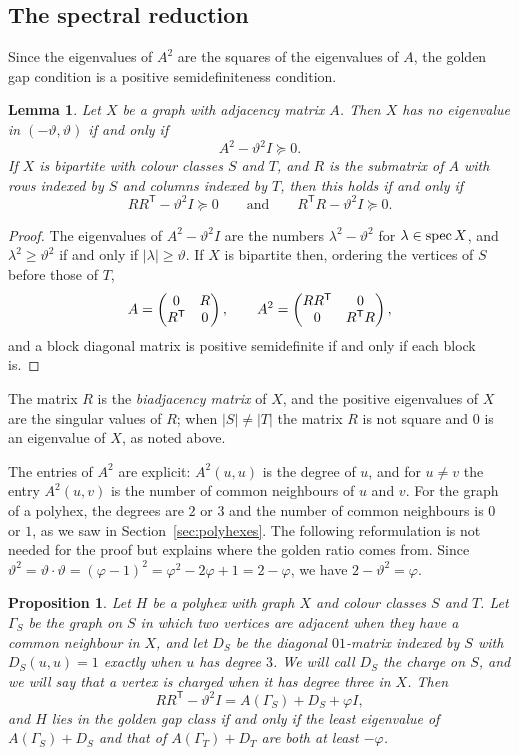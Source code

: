 \documentclass[11pt]{article}
\newcommand\vphi{\varphi}
\newcommand\thetaG{\vartheta}
\newcommand\spec{\opk{spec}}
\newcommand\tp{^{\mathsf T}}
\newcommand\abs[1]{\lvert #1\rvert}
\newtheorem{lemma}[theorem]{Lemma}
\newtheorem{proposition}[theorem]{Proposition}
\theoremstyle{definition}
\begin{document}
\subsection{The spectral reduction}

Since the eigenvalues of $A^2$ are the squares of the eigenvalues of $A$, the
golden gap condition is a positive semidefiniteness condition.

\begin{lemma}\label{lem:reduction}
Let $X$ be a graph with adjacency matrix $A$.  Then $X$ has no eigenvalue in
$(-\thetaG,\thetaG)$ if and only if
\[
 A^{2}-\thetaG^{2}I\succeq0 .
\]
If $X$ is bipartite with colour classes $S$ and $T$, and $R$ is the
submatrix of $A$ with rows indexed by $S$ and columns indexed by $T$, then
this holds if and only if
\[
 RR\tp-\thetaG^{2}I\succeq0
 \qquad\text{and}\qquad
 R\tp R-\thetaG^{2}I\succeq0 .
\]
\end{lemma}

\begin{proof}
The eigenvalues of $A^2-\thetaG^2I$ are the numbers $\lambda^2-\thetaG^2$
for $\lambda\in\spec X$, and $\lambda^2\ge\thetaG^2$ if and only if
$\abs\lambda\ge\thetaG$.  If $X$ is bipartite then, ordering the vertices of
$S$ before those of $T$,
\[
 A=\pmat{0 & R\\ R\tp & 0},\qquad
 A^{2}=\pmat{RR\tp & 0\\ 0 & R\tp R},
\]
and a block diagonal matrix is positive semidefinite if and only if each
block is.
\end{proof}

The matrix $R$ is the \textsl{biadjacency matrix} of $X$, and the positive
eigenvalues of $X$ are the singular values of $R$; when $\abs S\ne\abs T$
the matrix $R$ is not square and $0$ is an eigenvalue of $X$, as noted
above.

The entries of $A^2$ are explicit: $A^2(u,u)$ is the degree of $u$, and for
$u\ne v$ the entry $A^2(u,v)$ is the number of common neighbours of $u$ and
$v$.  For the graph of a polyhex, the degrees are $2$ or $3$ and the number
of common neighbours is $0$ or $1$, as we saw in
Section~\ref{sec:polyhexes}.  The following reformulation is not needed for
the proof but explains where the golden ratio comes from.  Since
$\thetaG^2=\thetaG\cdot\thetaG=(\vphi-1)^2=\vphi^2-2\vphi+1=2-\vphi$, we have
$2-\thetaG^2=\vphi$.

\begin{proposition}\label{prop:triangular}
Let $H$ be a polyhex with graph $X$ and colour classes $S$ and $T$.  Let $\Gamma_S$
be the graph on $S$ in which two vertices are adjacent when they have a
common neighbour in $X$, and let $D_S$ be the diagonal $01$-matrix indexed by
$S$ with $D_S(u,u)=1$ exactly when $u$ has degree $3$.  We will call $D_S$ the
\textsl{charge} on $S$, and we will say that a vertex is \textsl{charged} when
it has degree three in $X$.  Then
\[
 RR\tp-\thetaG^{2}I=A(\Gamma_S)+D_S+\vphi I ,
\]
and $H$ lies in the golden gap class if and only if the least eigenvalue of
$A(\Gamma_S)+D_S$ and that of $A(\Gamma_T)+D_T$ are both at least $-\vphi$.
\end{proposition}
\end{document}
